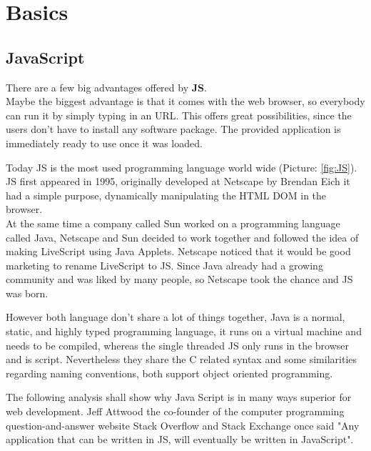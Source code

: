 \chapter{Basics}

\section{JavaScript}
There are a few big advantages offered by \textbf{\gls{JS}}.\\ Maybe the biggest advantage is that it comes with the web browser, so everybody can run it by simply typing in an \gls{URL}. This offers great possibilities, since the users don't have to install any software package. The provided application is immediately ready to use once it was loaded.

Today \gls{JS} is the most used programming language world wide (Picture: \ref{fig:JS}). \gls{JS} first appeared in 1995, originally developed at Netscape by Brendan Eich it had a simple purpose, dynamically manipulating the HTML DOM in the browser.\\
At the same time a company called Sun worked on a programming language called Java, Netscape and Sun decided to work together and followed the idea of making LiveScript using Java Applets.  Netscape noticed that it would be good marketing to rename LiveScript to \gls{JS}. Since Java already had a growing community and was liked by many people, so Netscape took the chance and \gls{JS} was born.

However both language don't share a lot of things together, Java is a normal, static, and highly typed programming language, it runs on a virtual machine and needs to be compiled, whereas the single threaded \gls{JS} only runs in the browser and is script. Nevertheless they share the C related syntax and some similarities regarding naming conventions, both support object oriented programming.

The following analysis shall show why Java Script is in many ways superior for web development. Jeff Attwood the co-founder of the  computer programming question-and-answer website Stack Overflow and Stack Exchange once said "Any application that can be written in \gls{JS}, will eventually be written in JavaScript". \cite{HistoryJS1} \cite{HistoryJS2} \cite{HistoryJS3}

